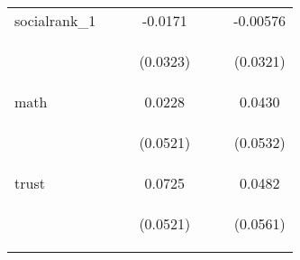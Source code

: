 \begin{center}
\begin{tabular}{lcccccc}
socialrank\_1 &  &  & -0.0171 &  &  & -0.00576 \\
\vspace{4pt} & \begin{footnotesize}\end{footnotesize} & \begin{footnotesize}\end{footnotesize} & \begin{footnotesize}(0.0323)\end{footnotesize} & \begin{footnotesize}\end{footnotesize} & \begin{footnotesize}\end{footnotesize} & \begin{footnotesize}(0.0321)\end{footnotesize} \\
math &  &  & 0.0228 &  &  & 0.0430 \\
\vspace{4pt} & \begin{footnotesize}\end{footnotesize} & \begin{footnotesize}\end{footnotesize} & \begin{footnotesize}(0.0521)\end{footnotesize} & \begin{footnotesize}\end{footnotesize} & \begin{footnotesize}\end{footnotesize} & \begin{footnotesize}(0.0532)\end{footnotesize} \\
trust &  &  & 0.0725 &  &  & 0.0482 \\
\vspace{4pt} & \begin{footnotesize}\end{footnotesize} & \begin{footnotesize}\end{footnotesize} & \begin{footnotesize}(0.0521)\end{footnotesize} & \begin{footnotesize}\end{footnotesize} & \begin{footnotesize}\end{footnotesize} & \begin{footnotesize}(0.0561)\end{footnotesize} \\

\end{tabular}
\end{center}
